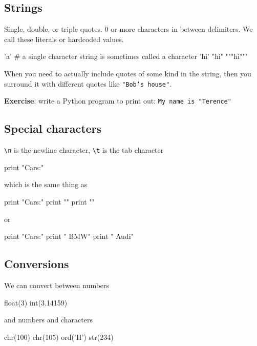 \begin{fullwidth}
\subsection{Strings}

Single, double, or triple quotes. 0 or more characters in between delimiters. We call these literals or hardcoded values.

\begin{pyconsole}[e]
'a'  # a single character string is sometimes called a character
'hi'
"hi"
"""hi"""
\end{pyconsole}

When you need to actually include quotes of some kind in the string, then you surround it with different quotes like {\tt "Bob's house"}.

{\bf Exercise}: write a Python program to print out: {\tt My name is "Terence"}

\subsection{Special characters}

{\tt \textbackslash n}  is the newline character, {\tt \textbackslash t}  is the tab character


\begin{pyconsole}[f]
print "Cars:\n\tBMW\n\tAudi"
\end{pyconsole}

which is the same thing as
 
\begin{pyconsole}[g]
print "Cars:"
print "\tBMW"
print "\tAudi"
\end{pyconsole}

or

\begin{pyconsole}[h]
print "Cars:"
print "	BMW"
print "	Audi"
\end{pyconsole}


\subsection{Conversions}

We can convert between numbers

\begin{pyconsole}[i]
float(3)
int(3.14159)
\end{pyconsole}

and numbers and characters

\begin{pyconsole}[j]
chr(100)
chr(105)
ord('H')
str(234)
\end{pyconsole}

\end{fullwidth}